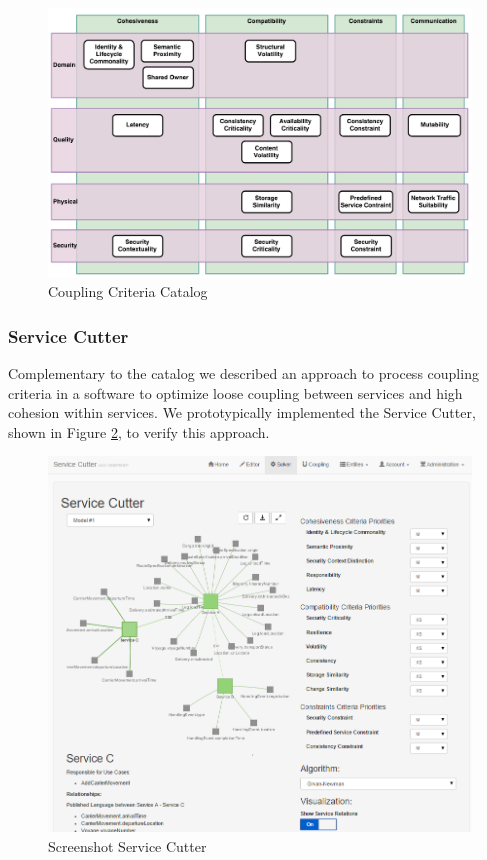 \begin{figure}[H]
	\centerline{\includegraphics[scale=0.5]{diagrams/CouplingCatalog.pdf}}
	\caption{Coupling Criteria Catalog}
	\label{fig:cc-catalog-mgmt-summary}
\end{figure}


\subsubsection{Service Cutter}


Complementary to the catalog we described an approach to process coupling criteria in a software to optimize loose coupling between services and high cohesion within services. We prototypically implemented the Service Cutter, shown in Figure \ref{fig:ServiceCutter-mgmt-summary}, to verify this approach.

\begin{figure}[H]
	\includegraphics[scale=0.65]{images/ServiceCutter.png}
	\caption{Screenshot Service Cutter}
	\label{fig:ServiceCutter-mgmt-summary}
\end{figure}

